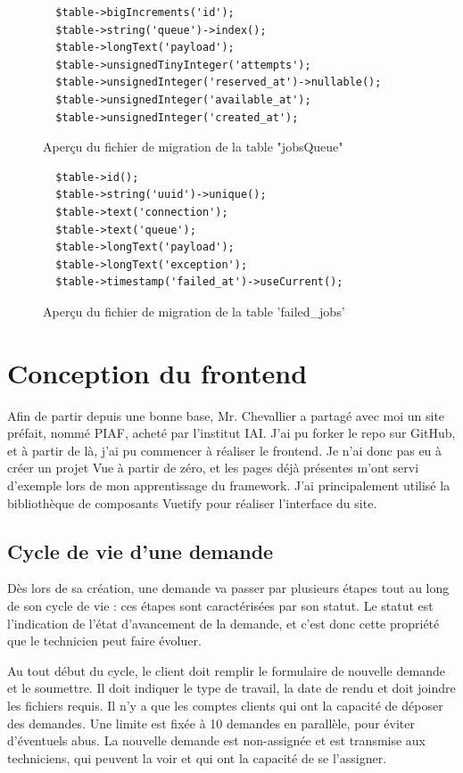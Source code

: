 \documentclass[
    iai, %
    eai, %
]{heig-tb}
\begin{document}
\begin{figure}[h]
  \begin{verbatim}
  $table->bigIncrements('id');
  $table->string('queue')->index();
  $table->longText('payload');
  $table->unsignedTinyInteger('attempts');
  $table->unsignedInteger('reserved_at')->nullable();
  $table->unsignedInteger('available_at');
  $table->unsignedInteger('created_at');
  \end{verbatim}
  \caption{Aperçu du fichier de migration de la table "jobsQueue"}
\end{figure}

\begin{figure}[h]
  \begin{verbatim}
  $table->id();
  $table->string('uuid')->unique();
  $table->text('connection');
  $table->text('queue');
  $table->longText('payload');
  $table->longText('exception');
  $table->timestamp('failed_at')->useCurrent();
  \end{verbatim}
  \caption{Aperçu du fichier de migration de la table 'failed\_jobs'}
\end{figure}

\chapter{Conception du frontend}
Afin de partir depuis une bonne base, Mr. Chevallier a partagé avec moi un site préfait, nommé PIAF, acheté par l'institut IAI.
J'ai pu forker le repo sur GitHub, et à partir de là, j'ai pu commencer à réaliser le frontend. Je n'ai donc pas eu à créer un projet Vue à partir de zéro, et les pages déjà présentes m'ont servi d'exemple lors de mon apprentissage du framework. J'ai principalement utilisé la bibliothèque de composants Vuetify pour réaliser l'interface du site.

\section{Cycle de vie d'une demande}
Dès lors de sa création, une demande va passer par plusieurs étapes tout au long de son cycle de vie : ces étapes sont caractérisées par son statut.
Le statut est l'indication de l'état d'avancement de la demande, et c'est donc cette propriété que le technicien peut faire évoluer.

Au tout début du cycle, le client doit remplir le formulaire de nouvelle demande et le soumettre. Il doit indiquer le type de travail, la date de rendu et doit joindre les fichiers requis.
Il n'y a que les comptes clients qui ont la capacité de déposer des demandes. Une limite est fixée à 10 demandes en parallèle, pour éviter d'éventuels abus.
La nouvelle demande est non-assignée et est transmise aux techniciens, qui peuvent la voir et qui ont la capacité de se l'assigner.
\end{document}
